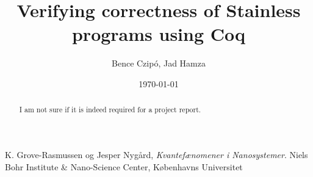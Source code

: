 \documentclass[a4paper]{article}
\title{Verifying correctness of Stainless programs using Coq}
\author{Bence Czipó, Jad Hamza}
\date{\today}
\begin{document}
\maketitle

\begin{abstract}
I am not sure if it is indeed required for a project report.
\end{abstract}











\begin{thebibliography}{9}
  K. Grove-Rasmussen og Jesper Nygård,
  \emph{Kvantefænomener i Nanosystemer}.
  Niels Bohr Institute \& Nano-Science Center, Københavns Universitet

\end{thebibliography}
\end{document}

